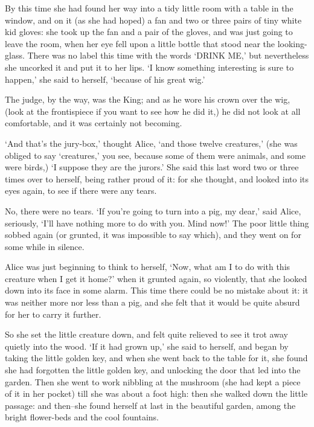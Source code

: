 \documentclass[statementpaper,twoside,openany]{memoir}
\begin{document}
By this time she had found her way into a tidy little room with a table in the window, and on it (as she had hoped) a fan and two or three pairs of tiny white kid gloves: she took up the fan and a pair of the gloves, and was just going to leave the room, when her eye fell upon a little bottle that stood near the looking-glass. There was no label this time with the words `DRINK ME,' but nevertheless she uncorked it and put it to her lips. `I know something interesting is sure to happen,' she said to herself, `because of his great wig.'

The judge, by the way, was the King; and as he wore his crown over the wig, (look at the frontispiece if you want to see how he did it,) he did not look at all comfortable, and it was certainly not becoming.

`And that's the jury-box,' thought Alice, `and those twelve creatures,' (she was obliged to say `creatures,' you see, because some of them were animals, and some were birds,) `I suppose they are the jurors.' She said this last word two or three times over to herself, being rather proud of it: for she thought, and looked into its eyes again, to see if there were any tears.

No, there were no tears. `If you're going to turn into a pig, my dear,' said Alice, seriously, `I'll have nothing more to do with you. Mind now!' The poor little thing sobbed again (or grunted, it was impossible to say which), and they went on for some while in silence.

Alice was just beginning to think to herself, `Now, what am I to do with this creature when I get it home?' when it grunted again, so violently, that she looked down into its face in some alarm. This time there could be no mistake about it: it was neither more nor less than a pig, and she felt that it would be quite absurd for her to carry it further.

So she set the little creature down, and felt quite relieved to see it trot away quietly into the wood. `If it had grown up,' she said to herself, and began by taking the little golden key, and when she went back to the table for it, she found she had forgotten the little golden key, and unlocking the door that led into the garden. Then she went to work nibbling at the mushroom (she had kept a piece of it in her pocket) till she was about a foot high: then she walked down the little passage: and then--she found herself at last in the beautiful garden, among the bright flower-beds and the cool fountains.
\end{document}
